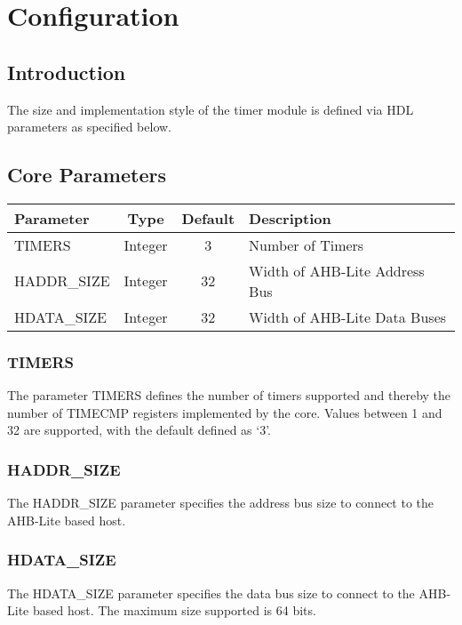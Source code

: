 \chapter{Configuration} \label{configurations}

\section{Introduction}\label{introduction-1}

The size and implementation style of the timer module is defined via HDL
parameters as specified below.

\section{Core Parameters}\label{core-parameters}

\begin{longtable}[]{@{}lccl@{}}
\toprule
Parameter & Type & Default & Description\tabularnewline
\midrule
\endhead
TIMERS & Integer & 3 & Number of Timers\tabularnewline
HADDR\_SIZE & Integer & 32 & Width of AHB-Lite Address
Bus\tabularnewline
HDATA\_SIZE & Integer & 32 & Width of AHB-Lite Data Buses\tabularnewline
\bottomrule
\end{longtable}

\subsection{TIMERS}\label{timers}

The parameter TIMERS defines the number of timers supported and thereby
the number of TIMECMP registers implemented by the core. Values between
1 and 32 are supported, with the default defined as `3'.

\subsection{HADDR\_SIZE}\label{haddr_size}

The HADDR\_SIZE parameter specifies the address bus size to connect to
the AHB-Lite based host.

\subsection{HDATA\_SIZE}\label{hdata_size}

The HDATA\_SIZE parameter specifies the data bus size to connect to the
AHB-Lite based host. The maximum size supported is 64 bits.

